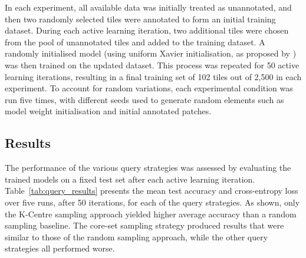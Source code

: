 In each experiment, all available data was initially treated as unannotated, and then two randomly selected tiles were annotated to form an initial training dataset. During each active learning iteration, two additional tiles were chosen from the pool of unannotated tiles and added to the training dataset. A randomly initialised model (using uniform Xavier initialisation, as proposed by \cite{glorot2010understanding}) was then trained on the updated dataset. This process was repeated for 50 active learning iterations, resulting in a final training set of 102 tiles out of 2,500 in each experiment. To account for random variations, each experimental condition was run five times, with different seeds used to generate random elements such as model weight initialisation and initial annotated patches.

\subsection{Results}
\label{subsec:active_results}


The performance of the various query strategies was assessed by evaluating the trained models on a fixed test set after each active learning iteration. Table~\ref{tab:query_results} presents the mean test accuracy and cross-entropy loss over five runs, after 50 iterations, for each of the query strategies. As shown, only the K-Centre sampling approach yielded higher average accuracy than a random sampling baseline. The core-set sampling strategy produced results that were similar to those of the random sampling approach, while the other query strategies all performed worse.

\begin{table}[b]
	\centering
	\caption{Test results for each query strategy after 50 active iterations. For Accuracy and Mean Class Accuracy higher is better and Loss lower is better.}
	\label{tab:query_results}
\end{table}

